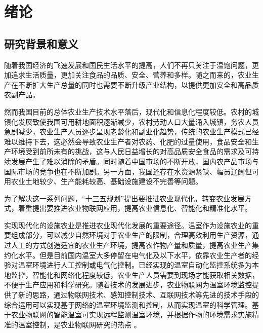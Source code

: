 

\chapter{绪论}
\label{chapter:Introduction}

\section{研究背景和意义}
随着我国经济的飞速发展和国民生活水平的提高，人们不再只关注于温饱问题，更加追求生活质量，更加关注食品的品质、安全、营养和多样\supercite{FengZhiming2007,ZhaoQiguo2011}。随之而来的，农业生产在不断扩大生产总量的同时也需要不断升级产业结构，以提供更加安全和高品质农副产品。

然而我国目前的总体农业生产技术水平落后，现代化和信息化程度较低。农村的城镇化发展致使我国可用耕地面积逐渐减少，农村劳动人口大量涌入城镇\supercite{YuJunli2001}，务农人员急剧减少，农业生产人员逐步呈现老龄化和副业化趋势\supercite{LuoChaobin2005}，传统的农业生产模式已经难以维持下去，这必然会导致农业生产者对农药、化肥的过量使用，食品安全和生产环境受到前所未有的挑战，这与人民日益增长的对高品质安全食品的需求及可持续发展产生了难以消除的矛盾。同时随着中国市场的不断开放，国内农产品市场与国际市场的竞争也在不断加剧。另一方面，我国还存在水资源紧缺、幅员辽阔但可用农业土地较少、生产能耗较高、基础设施建设不完善等问题。

为了解决这一系列问题，“十三五规划”提出要推进农业现代化，转变农业发展方式，着重提出要推进农业物联网应用，提高农业信息化、智能化和精准化水平。

实现现代化的设施农业是推进农业现代化发展的重要途径\supercite{LiuLei2013}。温室作为设施农业的重要组成部分，可以减少自然环境对于农业生产的限制，合理高效利用生产资源，通过人工的方式创造适宜的农业生产环境，提高农作物产量和质量，提高农业生产集约化水平。但是目前国内温室大多停留在电气化及以下水平，依靠农业生产者的经验对温室环境进行人工控制或电气化控制。已经实现的温室自动化监控系统多为本地监控，智能化和网络化程度较低，农业生产人员需要到现场才能获取相关数据，不便于生产应用和科学研究\supercite{ZhouDele2013}。随着技术的发展进步，农业物联网为温室环境监控提供了新的思路，通过物联网技术、感知控制技术、互联网技术等先进的技术手段的综合运用可以实现基于网络的温室环境监测和控制，从而实现温室的科学管理\supercite{ZhouChunsong2014,ZhongHuahui2011,HeFen2007}。基于农业物联网的智能温室可实现远程监测温室环境，并根据作物的环境需求实施精准的温室控制，是农业物联网研究的热点\supercite{ZhaoJing2010,QiaoXiaojun2005} 。

